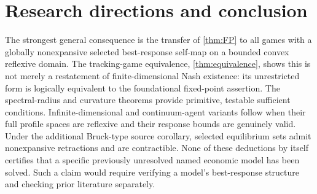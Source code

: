 \documentclass[11pt]{article}
\theoremstyle{definition}\newtheorem{definition}[theorem]{Definition}
\begin{document}
\section{Research directions and conclusion}
The strongest general consequence is the transfer of \cref{thm:FP} to all games with a globally nonexpansive selected best-response self-map on a bounded convex reflexive domain. The tracking-game equivalence, \cref{thm:equivalence}, shows this is not merely a restatement of finite-dimensional Nash existence: its unrestricted form is logically equivalent to the foundational fixed-point assertion. The spectral-radius and curvature theorems provide primitive, testable sufficient conditions. Infinite-dimensional and continuum-agent variants follow when their full profile spaces are reflexive and their response bounds are genuinely valid. Under the additional Bruck-type source corollary, selected equilibrium sets admit nonexpansive retractions and are contractible. None of these deductions by itself certifies that a specific previously unresolved named economic model has been solved. Such a claim would require verifying a model's best-response structure and checking prior literature separately.
\end{document}
